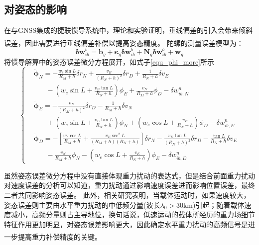 \documentclass[12pt,a4,utf8]{article}
\newcommand{\upcite}[1]{\textsuperscript{\textsuperscript{\cite{#1}}}} %
\begin{document}
\subsection{对姿态的影响}
在与GNSS集成的捷联惯导系统中，理论和实验证明，垂线偏差的引入会带来倾斜误差，因此需要进行垂线偏差补偿以提高姿态精度\upcite{grejner1998gravity,dai2015dynamic}。
陀螺的测量误差模型为：
\begin{equation}
      \bm{\delta w}^b_{ib} = \bm{b}_g + \bm{\kappa}_g \bm{\delta w}^b_{ib} + \bm{\text{N}}_g \bm{\delta w}^b_{ib} + \bm{w}_g
      \label{gyro_bias}
\end{equation}
将惯导解算中的姿态误差微分方程展开，如式子\ref{equ_phi_more}所示
\begin{equation}
            \left\{ \begin{aligned}
            & \dot{\bm{\phi}}_N=-\frac{w_e\sin L}{R_M + h}\delta r_N+\frac{v_E}{(R_N+h)^2}\delta r_D + \frac{1}{R_N + h}\delta v_E \\
            & \ \ \ \ \ \ \ \ - \left ( w_e\sin L + \frac{v_E\tan L}{R_N +h} \right )\phi_E + \frac{v_N}{R_M+h}\phi_D - \delta w^n_{ib,N} \\ 
            & \dot{\bm{\phi}}_E= - \frac{v_N}{(R_M + h)^2}\delta r_D - \frac{1}{R_M + h }\delta v_N \\
            & \ \ \ \ \ \ \ \ + \left ( w_e \sin L + \frac{v_E\tan L}{R_N + h} \right )\phi_N + \left ( w_e \cos L +\frac{v_E}{R_N + h} \right )\phi_D - \delta w^n_{ib,E}\\ 
            & \dot{\bm{\phi}}_D= - \left [ \frac{w_e\cos L}{R_M + h}+ \frac{v_E\sec ^2L}{(R_M + h)(R_N + h)}\right ]\delta r_N - \frac{v_E \tan L}{(R_N+h)^2}\delta r_D - \frac{\tan L}{R_N + h}\delta v_E \\
            & \ \ \ \ \ \ \ \ - \frac{v_N}{R_M + h}\phi_N - \left ( w_e \cos L + \frac{v_E}{R_N + h } \right )\phi_E - \delta w^n_{ib,D}
      \end{aligned} \right.
      \label{equ_phi_more}
\end{equation}

虽然姿态误差微分方程中没有直接体现重力扰动的表达式，但是结合前面重力扰动对速度误差的分析可以知道，重力扰动通过影响速度误差进而影响位置误差，最终二者共同影响姿态误差。
此外，相关研究表明，当载体运动时，如果速度较大，姿态误差则主要由水平重力扰动的中低频分量(波长$\lambda_0>30$km)引起；随着载体速度减小，高频分量则占主导地位，换句话说，低速运动的载体所经历的重力场细节特征作用更加明显，对姿态误差影响更大，因此确定水平重力扰动的高频信号是进一步提高重力补偿精度的关键\upcite{jekeli1994airborne,1020386196.nh,harriman1986gravity}。
\end{document}
